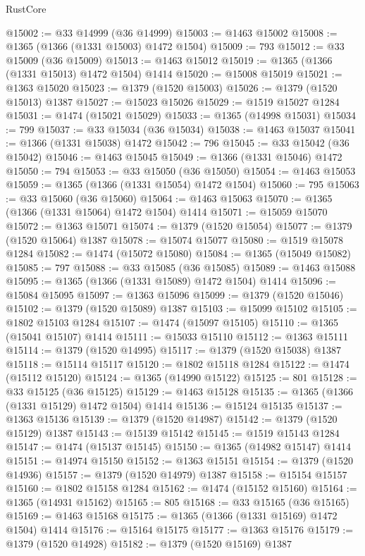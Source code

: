 \begin{lexlean}{RustCore}
\begin{coremodule}
@15002 := @33 @14999 (@36 @14999)
@15003 := @1463 @15002
@15008 := @1365 (@1366 (@1331 @15003) @1472 @1504)
@15009 := 793
@15012 := @33 @15009 (@36 @15009)
@15013 := @1463 @15012
@15019 := @1365 (@1366 (@1331 @15013) @1472 @1504) @1414
@15020 := @15008 @15019
@15021 := @1363 @15020
@15023 := @1379 (@1520 @15003)
@15026 := @1379 (@1520 @15013) @1387
@15027 := @15023 @15026
@15029 := @1519 @15027 @1284
@15031 := @1474 (@15021 @15029)
@15033 := @1365 (@14998 @15031)
@15034 := 799
@15037 := @33 @15034 (@36 @15034)
@15038 := @1463 @15037
@15041 := @1366 (@1331 @15038) @1472
@15042 := 796
@15045 := @33 @15042 (@36 @15042)
@15046 := @1463 @15045
@15049 := @1366 (@1331 @15046) @1472
@15050 := 794
@15053 := @33 @15050 (@36 @15050)
@15054 := @1463 @15053
@15059 := @1365 (@1366 (@1331 @15054) @1472 @1504)
@15060 := 795
@15063 := @33 @15060 (@36 @15060)
@15064 := @1463 @15063
@15070 := @1365 (@1366 (@1331 @15064) @1472 @1504) @1414
@15071 := @15059 @15070
@15072 := @1363 @15071
@15074 := @1379 (@1520 @15054)
@15077 := @1379 (@1520 @15064) @1387
@15078 := @15074 @15077
@15080 := @1519 @15078 @1284
@15082 := @1474 (@15072 @15080)
@15084 := @1365 (@15049 @15082)
@15085 := 797
@15088 := @33 @15085 (@36 @15085)
@15089 := @1463 @15088
@15095 := @1365 (@1366 (@1331 @15089) @1472 @1504) @1414
@15096 := @15084 @15095
@15097 := @1363 @15096
@15099 := @1379 (@1520 @15046)
@15102 := @1379 (@1520 @15089) @1387
@15103 := @15099 @15102
@15105 := @1802 @15103 @1284
@15107 := @1474 (@15097 @15105)
@15110 := @1365 (@15041 @15107) @1414
@15111 := @15033 @15110
@15112 := @1363 @15111
@15114 := @1379 (@1520 @14995)
@15117 := @1379 (@1520 @15038) @1387
@15118 := @15114 @15117
@15120 := @1802 @15118 @1284
@15122 := @1474 (@15112 @15120)
@15124 := @1365 (@14990 @15122)
@15125 := 801
@15128 := @33 @15125 (@36 @15125)
@15129 := @1463 @15128
@15135 := @1365 (@1366 (@1331 @15129) @1472 @1504) @1414
@15136 := @15124 @15135
@15137 := @1363 @15136
@15139 := @1379 (@1520 @14987)
@15142 := @1379 (@1520 @15129) @1387
@15143 := @15139 @15142
@15145 := @1519 @15143 @1284
@15147 := @1474 (@15137 @15145)
@15150 := @1365 (@14982 @15147) @1414
@15151 := @14974 @15150
@15152 := @1363 @15151
@15154 := @1379 (@1520 @14936)
@15157 := @1379 (@1520 @14979) @1387
@15158 := @15154 @15157
@15160 := @1802 @15158 @1284
@15162 := @1474 (@15152 @15160)
@15164 := @1365 (@14931 @15162)
@15165 := 805
@15168 := @33 @15165 (@36 @15165)
@15169 := @1463 @15168
@15175 := @1365 (@1366 (@1331 @15169) @1472 @1504) @1414
@15176 := @15164 @15175
@15177 := @1363 @15176
@15179 := @1379 (@1520 @14928)
@15182 := @1379 (@1520 @15169) @1387

\end{coremodule}
\end{lexlean}
